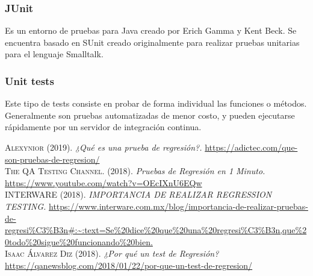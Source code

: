 \documentclass[conference]{IEEEtran}
\begin{document}
\subsubsection{JUnit}

Es un entorno de pruebas para Java creado por Erich Gamma y Kent Beck. Se encuentra basado en SUnit creado originalmente para realizar pruebas unitarias para el lenguaje Smalltalk.

\subsubsection{Unit tests}

Este tipo de tests consiste en probar de forma individual las funciones o métodos. Generalmente son pruebas automatizadas de menor costo, y pueden ejecutarse rápidamente por un servidor de integración continua.



\normalsize

\begin{thebibliography}{}
 \textsc{Alexynior} (2019). \textit{¿Qué es una prueba de regresión?.} \url{https://adictec.com/que-son-pruebas-de-regresion/}\\

 \textsc{The QA Testing Channel.} (2018). \textit{Pruebas de Regresión en 1 Minuto.} \url{https://www.youtube.com/watch?v=OEcIXnU6EQw} \\


 \textsc{INTERWARE} (2018). \textit{IMPORTANCIA DE REALIZAR REGRESSION TESTING.} \url{https://www.interware.com.mx/blog/importancia-de-realizar-pruebas-de-regresi\%C3\%B3n\#:\~:text=Se\%20dice\%20que\%20una\%20regresi\%C3\%B3n,que\%20todo\%20sigue\%20funcionando\%20bien.} \\

 \textsc{Isaac Álvarez Diz} (2018). \textit{¿Por qué un test de Regresión?} \url{https://qanewsblog.com/2018/01/22/por-que-un-test-de-regresion/} \\
\end{thebibliography}
\end{document}
